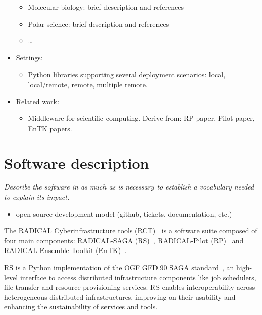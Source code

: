 \documentclass[preprint,12pt, a4paper]{elsarticle}
\begin{document}
\begin{itemize}
\begin{itemize}
      \item Molecular biology: brief description and references
      \item Polar science: brief description and references
      \item \ldots
    \end{itemize}
  \item Settings:
    \begin{itemize}
      \item Python libraries supporting several deployment scenarios: local,
      local/remote, remote, multiple remote.
    \end{itemize}
  \item Related work:
    \begin{itemize}
      \item Middleware for scientific computing. Derive from: RP paper, Pilot
      paper, EnTK papers.
    \end{itemize}
\end{itemize}


\section{Software description}\label{sec:description}

{\em Describe the software in as much as is necessary to establish a
vocabulary needed to explain its impact.}

\begin{itemize}
  \item open source development model (github, tickets, documentation,
  etc.)
\end{itemize}

The RADICAL Cyberinfrastructure tools (RCT)~\cite{web-rct} is a software
suite composed of four main components: RADICAL-SAGA
(RS)~\cite{merzky2015saga}, RADICAL-Pilot (RP)~\cite{merzky2018using} and
RADICAL-Ensemble Toolkit (EnTK)~\cite{balasubramanian2018harnessing}.

RS is a Python implementation of the OGF GFD.90 SAGA
standard~\cite{goodale2006saga}, an high-level interface to access
distributed infrastructure components like job schedulers, file transfer and
resource provisioning services. RS enables interoperability across
heterogeneous distributed infrastructures, improving on their usability and
enhancing the sustainability of services and tools.
\end{document}
